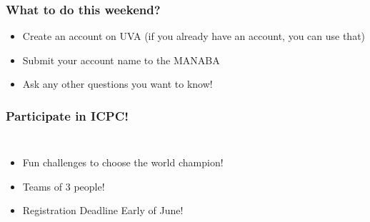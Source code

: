 \documentclass{beamer}
\begin{document}
\begin{frame}
  \frametitle{What to do this weekend?}

  \begin{itemize}
  \item Create an account on UVA (if you already have an account, you can use that)

    \bigskip

  \item Submit your account name to the MANABA

    \bigskip

  \item Ask any other questions you want to know!
  \end{itemize}
\end{frame}

\begin{frame}
  \frametitle{Participate in ICPC!}
  \begin{columns}
  \begin{itemize}
    \item Fun challenges to choose the world champion!
    \item Teams of 3 people!
    \item Registration Deadline Early of June!
  \end{itemize}


\end{columns}
\end{frame}
\end{document}
